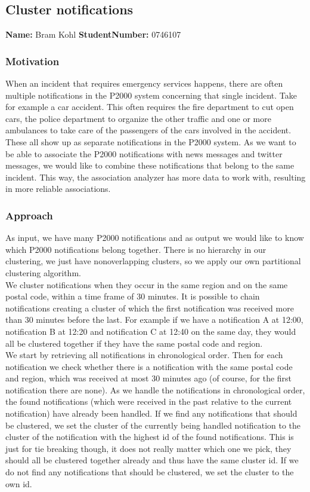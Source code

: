 \subsection{Cluster notifications}
\textbf{Name:} Bram Kohl \indent \textbf{StudentNumber:} 0746107

\subsubsection*{Motivation}
When an incident that requires emergency services happens, there are often multiple notifications in the P2000 system concerning that single incident. Take for example a car accident. This often requires the fire department to cut open cars, the police department to organize the other traffic and one or more ambulances to take care of the passengers of the cars involved in the accident. These all show up as separate notifications in the P2000 system. As we want to be able to associate the P2000 notifications with news messages and twitter messages, we would like to combine these notifications that belong to the same incident. This way, the association analyzer has more data to work with, resulting in more reliable associations.
\subsubsection*{Approach}
As input, we have many P2000 notifications and as output we would like to know which P2000 notifications belong together. There is no hierarchy in our clustering, we just have nonoverlapping clusters, so we apply our own partitional clustering algorithm.\\

We cluster notifications when they occur in the same region and on the same postal code, within a time frame of 30 minutes. It is possible to chain notifications creating a cluster of which the first notification was received more than 30 minutes before the last. For example if we have a notification A at 12:00, notification B at 12:20 and notification C at 12:40 on the same day, they would all be clustered together if they have the same postal code and region.\\

We start by retrieving all notifications in chronological order. Then for each notification we check whether there is a notification with the same postal code and region, which was received at most 30 minutes ago (of course, for the first notification there are none). As we handle the notifications in chronological order, the found notifications (which were received in the past relative to the current notification) have already been handled. If we find any notifications that should be clustered, we set the cluster of the currently being handled notification to the cluster of the notification with the highest id of the found notifications. This is just for tie breaking though, it does not really matter which one we pick, they should all be clustered together already and thus have the same cluster id. If we do not find any notifications that should be clustered, we set the cluster to the own id.\\

